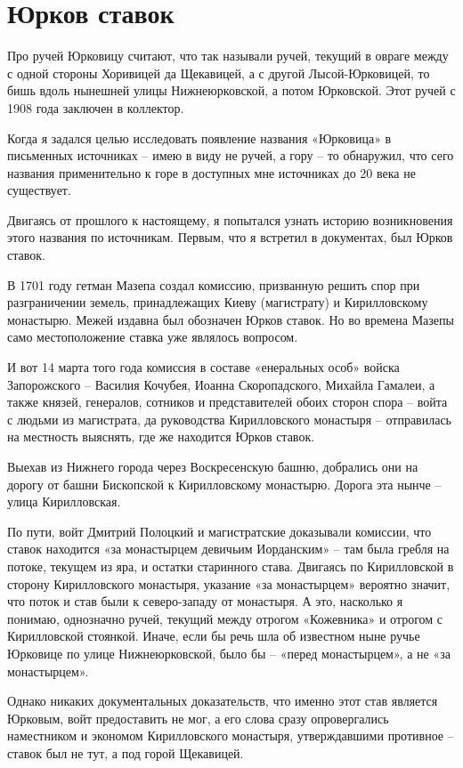 \chapter{Юрков ставок}

Про ручей Юрковицу считают, что так называли ручей, текущий в овраге между с одной стороны Хоривицей да Щекавицей, а с другой Лысой-Юрковицей, то бишь вдоль нынешней улицы Нижнеюрковской, а потом Юрковской. Этот ручей с 1908 года заключен в коллектор.

Когда я задался целью исследовать появление названия «Юрковица» в письменных источниках – имею в виду не ручей, а гору – то обнаружил, что сего названия применительно к горе в доступных мне источниках до 20 века не существует.

Двигаясь от прошлого к настоящему, я попытался узнать историю возникновения этого названия по источникам. Первым, что я встретил в документах, был Юрков ставок.

В 1701 году гетман Мазепа создал комиссию, призванную решить спор при разграничении земель, принадлежащих Киеву (магистрату) и Кирилловскому монастырю. Межей издавна был обозначен Юрков ставок. Но во времена Мазепы само местоположение ставка уже являлось вопросом.

И вот 14 марта того года комиссия в составе «енеральных особ» войска Запорожского – Василия Кочубея, Иоанна Скоропадского, Михайла Гамалеи, а также князей, генералов, сотников и представителей обоих сторон спора – войта с людьми из магистрата, да руководства Кирилловского монастыря – отправилась на местность выяснять, где же находится Юрков ставок.

Выехав из Нижнего города через Воскресенскую башню, добрались они на дорогу от башни Бископской к Кирилловскому монастырю. Дорога эта нынче – улица Кирилловская.

По пути, войт Дмитрий Полоцкий и магистратские доказывали комиссии, что ставок находится «за монастырцем девичьим Иорданским» – там была гребля на потоке, текущем из яра, и остатки старинного става. Двигаясь по Кирилловской в сторону Кирилловского монастыря, указание «за монастырцем» вероятно значит, что поток и став были к северо-западу от монастыря. А это, насколько я понимаю, однозначно ручей, текущий между отрогом «Кожевника» и отрогом с Кирилловской стоянкой. Иначе, если бы речь шла об известном ныне ручье Юрковице по улице Нижнеюрковской, было бы – «перед монастырцем», а не «за монастырцем».

Однако никаких документальных доказательств, что именно этот став является Юрковым, войт предоставить не мог, а его слова сразу опровергались наместником и экономом Кирилловского монастыря, утверждавшими противное – ставок был не тут, а под горой Щекавицей.

